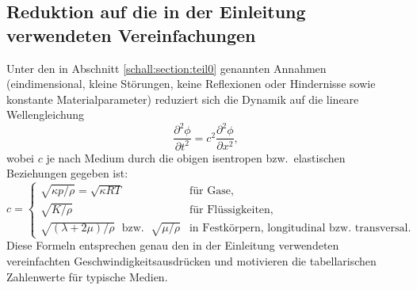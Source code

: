 %
%

\subsection{Reduktion auf die in der Einleitung verwendeten Vereinfachungen}
Unter den in Abschnitt \ref{schall:section:teil0} genannten Annahmen (eindimensional,
kleine Störungen, keine Reflexionen oder Hindernisse sowie konstante
Materialparameter) reduziert sich die Dynamik auf die lineare
Wellengleichung
\[
    \frac{\partial^2 \phi}{\partial t^2}=c^2\frac{\partial^2 \phi}{\partial x^2},
\]
wobei $c$ je nach Medium durch die obigen isentropen bzw.\ elastischen
Beziehungen gegeben ist:
\[
    c=\begin{cases}
    \sqrt{\kappa p/\rho}=\sqrt{\kappa R T}                    & \text{für Gase},\\[1mm]
    \sqrt{K/\rho}                                            & \text{für Flüssigkeiten},\\[1mm]
    \sqrt{(\lambda+2\mu)/\rho}\;\text{ bzw. }\;\!\sqrt{\mu/\rho} & \text{in Festkörpern, longitudinal bzw.~transversal}.
\end{cases}
\]
Diese Formeln entsprechen genau den in der Einleitung verwendeten
vereinfachten Geschwindigkeitsausdrücken und motivieren die
tabellarischen Zahlenwerte für typische Medien.
